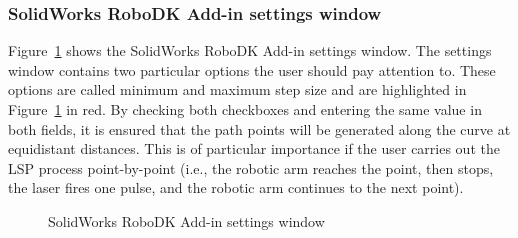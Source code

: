 \subsubsection*{SolidWorks RoboDK Add-in settings window}

Figure~\ref{fig:solidworkssettings} shows the SolidWorks RoboDK Add-in settings window. The settings window contains two particular options the user should pay attention to. These options are called minimum and maximum step size and are highlighted in Figure~\ref{fig:solidworkssettings} in red. By checking both checkboxes and entering the same value in both fields, it is ensured that the path points will be generated along the curve at equidistant distances. This is of particular importance if the user carries out the LSP process  point-by-point (i.e., the robotic arm reaches the point, then stops, the laser fires one pulse, and the robotic arm continues to the next point).


\begin{figure}[h]
    \centering
    \noindent{}
    \caption{SolidWorks RoboDK Add-in settings window}
    \label{fig:solidworkssettings}
\end{figure}







\begin{comment}

\subsubsection*{Importing curves from Solidworks}

To import curves from SolidWorks to RoboDK, SolidWorks offers two options:

\begin{enumerate}

\item PŘEDĚLAT FORMU, ABY BYLO PODOBNÉ.

\item \textbf{Opening an existing RoboDK station} - Using the \inline{Settings} control element of the SolidWorks RoboDK Add-in and then selecting the current project with the \inline{Load Project...} button. The next step is to click the \inline{LoadCurves} button and highlight the curves that define the robotic arm path and the adjacent surfaces of these curves. Lastly, the action is confirmed by pressing the \inline{checkmark} button. The curve is then opened in the selected project. 

\item \textbf{Creating a~new RoboDK station} - In this case, the robot path is selected the same way as described in the previous point. A~new RoboDK station containing the robotic arm path is opened after pressing the \inline{checkmark} button.

\end{enumerate}

\end{comment}

